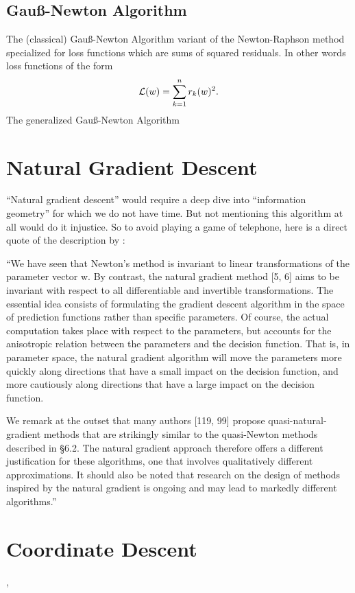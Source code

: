 


\subsection{Gauß-Newton Algorithm}

The (classical) Gauß-Newton Algorithm variant of the Newton-Raphson method
specialized for loss functions which are sums of squared residuals. In other
words loss functions of the form
\begin{align*}
	\mathcal{L}(w) = \sum_{k=1}^n r_k(w)^2.
\end{align*}
The generalized Gauß-Newton Algorithm 
\textcite{bottouOptimizationMethodsLargeScale2018}



\section{Natural Gradient Descent}

``Natural gradient descent'' would require a deep dive into ``information geometry''
for which we do not have time. But not mentioning this algorithm at all would do it
injustice. So to avoid playing a game of telephone, here is a direct quote of
the description by \textcite{bottouOptimizationMethodsLargeScale2018}:

``We have seen that Newton's method is invariant to linear transformations of
the parameter vector w. By contrast, the natural gradient method [5, 6] aims to
be invariant with respect to all differentiable and invertible transformations.
The essential idea consists of formulating the gradient descent algorithm in the
space of prediction functions rather than specific parameters. Of course, the
actual computation takes place with respect to the parameters, but accounts for
the anisotropic relation between the parameters and the decision function. That
is, in parameter space, the natural gradient algorithm will move the parameters
more quickly along directions that have a small impact on the decision function,
and more cautiously along directions that have a large impact on the decision
function.

We remark at the outset that many authors [119, 99] propose
quasi-natural-gradient methods that are strikingly similar to the quasi-Newton
methods described in §6.2. The natural gradient approach therefore offers a
different justification for these algorithms, one that involves qualitatively
different approximations. It should also be noted that research on the design of
methods inspired by the natural gradient is ongoing and may lead to markedly
different algorithms.''

\section{Coordinate Descent}

\textcite[7.3]{bottouOptimizationMethodsLargeScale2018}, \textcite[6.4]{bubeckConvexOptimizationAlgorithms2015}



\endinput
